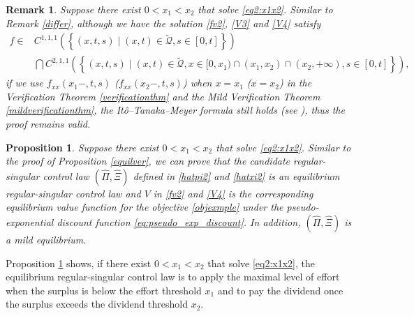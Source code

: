 \documentclass[11pt,reqno]{article}%
\newtheorem{proposition}[theorem]{Proposition}
\newtheorem{remark}[theorem]{Remark}
\numberwithin{equation}{section}
\begin{document}
\begin{remark}
Suppose there exist  $0 < x_1 < x_2$ that solve \eqref{eq2:x1x2}. Similar to Remark \ref{differ}, although we have the solution \eqref{fv2}, \eqref{V3} and \eqref{V4} satisfy
\begin{equation}
\begin{aligned}
f\in &C^{1,1,1}\left(\left\{(x,t,s)\mid (x,t)\in\mathcal{\tilde{Q}}, s\in [0,t]\right\}\right)\\&\bigcap C^{2,1,1}\left(\left\{(x,t,s)\mid (x,t)\in\mathcal{\tilde{Q}},x\in[0,x_1)\cap(x_1,x_2)\cap(x_2,+\infty), s\in [0,t]\right\}\right),\end{aligned}\nonumber
\end{equation}
if we use $f_{xx}(x_1-,t,s)$ ($f_{xx}(x_2-,t,s)$) when $x=x_1$ ($x=x_2$) in the Verification Theorem \ref{verificationthm} and the Mild Verification Theorem \ref{mildverificationthm}, the It\^{o}--Tanaka--Meyer formula still holds (see \citet[Theorem 3.1 and Remark 3.3]{peskir2007change}), thus the proof remains valid. 
\end{remark}

\begin{proposition}\label{equilver2}
Suppose there exist  $0 < x_1 < x_2$ that solve \eqref{eq2:x1x2}. Similar to the proof of Proposition \ref{equilver}, we can prove that the candidate regular-singular control law $\left(\hat\Pi,\hat\Xi\right)$ defined in \eqref{hatpi2} and \eqref{hatxi2} is an equilibrium regular-singular control law	  and $V$ in \eqref{fv2} and \eqref{V4} is the corresponding equilibrium value function for the objective \eqref{objexmple} under the pseudo-exponential discount function \eqref{eq:pseudo_exp_discount}. In addition, $\left(\hat\Pi,\hat\Xi\right)$ is a mild equilibrium.
\end{proposition}

Proposition \ref{equilver2} shows, if there exist  $0 < x_1 < x_2$ that solve \eqref{eq2:x1x2},  the equilibrium regular-singular control law is to apply the maximal level of effort when the surplus is below the effort threshold $x_1$ and to pay the dividend once the surplus exceeds the dividend threshold $x_2$.
\end{document}
